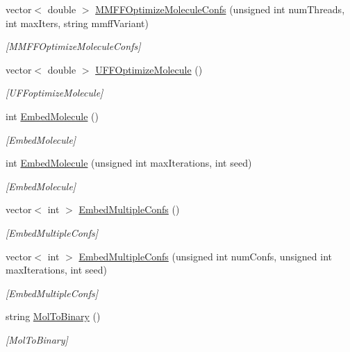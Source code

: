\begin{DoxyCompactItemize}
vector$<$ double $>$ \hyperlink{class_molecule_a839e0ee89e2355a5451cd0f8fdff0a90}{M\+M\+F\+F\+Optimize\+Molecule\+Confs} (unsigned int num\+Threads, int max\+Iters, string mmff\+Variant)
\begin{DoxyCompactList}\small\item\em \mbox{[}M\+M\+F\+F\+Optimize\+Molecule\+Confs\mbox{]} \end{DoxyCompactList}\item 
vector$<$ double $>$ \hyperlink{class_molecule_a5a7fe2f265ee8e8d4aeebfd41bf0ebdc}{U\+F\+F\+Optimize\+Molecule} ()
\begin{DoxyCompactList}\small\item\em \mbox{[}U\+F\+Foptimize\+Molecule\mbox{]} \end{DoxyCompactList}\item 
int \hyperlink{class_molecule_ab5b0afe25fe921c55a3a9ccd3de78b08}{Embed\+Molecule} ()
\begin{DoxyCompactList}\small\item\em \mbox{[}Embed\+Molecule\mbox{]} \end{DoxyCompactList}\item 
int \hyperlink{class_molecule_a49385d99cee0aba8c758a1420ba7c88d}{Embed\+Molecule} (unsigned int max\+Iterations, int seed)
\begin{DoxyCompactList}\small\item\em \mbox{[}Embed\+Molecule\mbox{]} \end{DoxyCompactList}\item 
vector$<$ int $>$ \hyperlink{class_molecule_a05d32198715c54d6db4c139e4c9a3985}{Embed\+Multiple\+Confs} ()
\begin{DoxyCompactList}\small\item\em \mbox{[}Embed\+Multiple\+Confs\mbox{]} \end{DoxyCompactList}\item 
vector$<$ int $>$ \hyperlink{class_molecule_a3364337cff6c6a4d382f8653da23a54f}{Embed\+Multiple\+Confs} (unsigned int num\+Confs, unsigned int max\+Iterations, int seed)
\begin{DoxyCompactList}\small\item\em \mbox{[}Embed\+Multiple\+Confs\mbox{]} \end{DoxyCompactList}\item 
string \hyperlink{class_molecule_a49bb8305f51929c61864c2f2d7099c3f}{Mol\+To\+Binary} ()
\begin{DoxyCompactList}\small\item\em \mbox{[}Mol\+To\+Binary\mbox{]} \end{DoxyCompactList}\item 

\end{DoxyCompactItemize}
